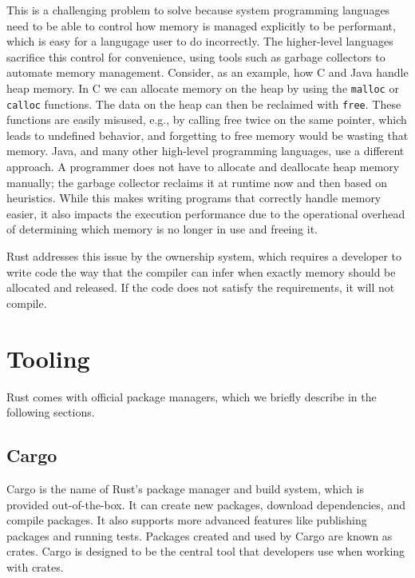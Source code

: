 \documentclass[paper=a4,%
  twoside,%
  BCOR4mm,%
  abstract=true,%
  toc=bibliography,%
  chapterprefix=true,%
  toc=bibliographynumbered,%
  open=right,%
  english,%
  pagesize=pdftex]{scrreprt}
\begin{document}
This is a challenging problem to solve because system programming languages need to be able to control how memory is managed explicitly to be performant, which is easy for a langugage user to do incorrectly. The higher-level languages sacrifice this control for convenience, using tools such as garbage collectors to automate memory management. Consider, as an example, how C and Java handle heap memory. In C we can allocate memory on the heap by using the \texttt{malloc} or \texttt{calloc} functions. The data on the heap can then be reclaimed with \texttt{free}. These functions are easily misused, e.g., by calling free twice on the same pointer, which leads to undefined behavior, and forgetting to free memory would be wasting that memory. Java, and many other high-level programming languages, use a different approach. A programmer does not have to allocate and deallocate heap memory manually; the garbage collector reclaims it at runtime now and then based on heuristics. While this makes writing programs that correctly handle memory easier, it also impacts the execution performance due to the operational overhead of determining which memory is no longer in use and freeing it.

Rust addresses this issue by the ownership system, which requires a developer to write code the way that the compiler can infer when exactly memory should be allocated and released. If the code does not satisfy the requirements, it will not compile.

\section{Tooling}
Rust comes with official package managers, which we briefly describe in the following sections.

\subsection{Cargo}
Cargo is the name of Rust's package manager and build system, which is provided out-of-the-box. It can create new packages, download dependencies, and compile packages. It also supports more advanced features like publishing packages and running tests. Packages created and used by Cargo are known as crates. Cargo is designed to be the central tool that developers use when working with crates.
\end{document}
